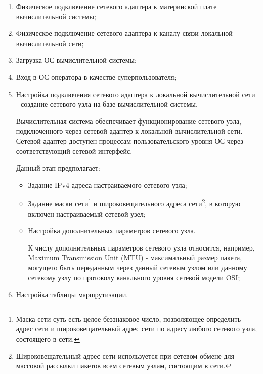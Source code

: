 	\begin{enumerate}

		\item Физическое подключение сетевого адаптера к материнской плате вычислительной системы;

		\item Физическое подключение сетевого адаптера к каналу связи локальной вычислительной сети;

		\item Загрузка ОС вычислительной системы;

		\item Вход в ОС оператора в качестве суперпользователя;

		\item Настройка подключения сетевого адаптера к локальной вычислительной сети - создание сетевого узла на базе вычислительной системы. 
		
		Вычислительная система обеспечивает функционирование сетевого узла, подключенного через сетевой адаптер к локальной вычислительной сети.
		Сетевой адаптер доступен процессам пользовательского уровня ОС через соответствующий сетевой интерфейс.

		Данный этап предполагает:

			\begin{itemize}

				\item Задание IPv4-адреса настраиваемого сетевого узла;
				\item Задание маски сети\footnote{Маска сети суть есть целое беззнаковое число, позволяющее определить адрес сети и широковещательный адрес
				сети по адресу любого сетевого узла, состоящего в сети.} и широковещательного адреса сети\footnote{Широковещательный адрес сети используется
				при сетевом обмене для массовой рассылки пакетов всем сетевым узлам, состоящим в сети.}, в которую включен настраиваемый сетевой узел;
				\item Настройка дополнительных параметров сетевого узла.
				
				К числу дополнительных параметров сетевого узла относится, например, Maximum Transmission Unit
				(MTU) - максимальный размер пакета, могущего быть переданным через данный сетевым узлом или данному сетевому узлу
				по протоколу канального уровня сетевой модели OSI;

			\end{itemize}

		\item Настройка таблицы маршрутизации.


\end{enumerate}
